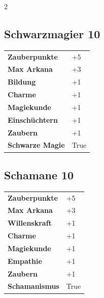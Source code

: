 \begin{multicols}{2}
\begin{tcolorbox}

\end{tcolorbox}

\begin{tcolorbox}
    \subsection*{Schwarzmagier \hfill \small{10 }}
    \tcblower




\begin{tabular}{@{}ll@{}}
    \textbf{Zauberpunkte} & +5\\
    \textbf{Max Arkana} & +3\\
    \textbf{Bildung} & +1\\
    \textbf{Charme} & +1\\
    \textbf{Magiekunde} & +1\\
    \textbf{Einschüchtern} & +1\\
    \textbf{Zaubern} & +1\\
    \textbf{Schwarze Magie} & True\\
\end{tabular}


\end{tcolorbox}

\begin{tcolorbox}
    \subsection*{Schamane \hfill \small{10 }}
    \tcblower




\begin{tabular}{@{}ll@{}}
    \textbf{Zauberpunkte} & +5\\
    \textbf{Max Arkana} & +3\\
    \textbf{Willenskraft} & +1\\
    \textbf{Charme} & +1\\
    \textbf{Magiekunde} & +1\\
    \textbf{Empathie} & +1\\
    \textbf{Zaubern} & +1\\
    \textbf{Schamanismus} & True\\
\end{tabular}


\end{tcolorbox}
\end{multicols}
